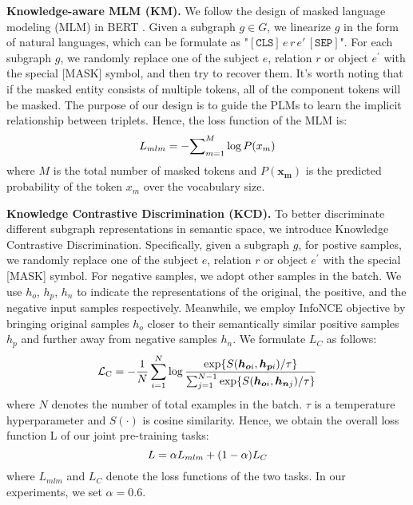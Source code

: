\documentclass[sigconf,natbib=true,anonymous=False]{acmart}
\def\bs{\boldsymbol}
\begin{document}
\textbf{Knowledge-aware MLM (KM).} We follow the design of masked language modeling (MLM) in BERT \cite{devlin2018bert}. Given a subgraph $g \in G$, we linearize $g$ in the form of natural languages, which can be formulate as "$\mathtt{[CLS]} \,  e\, r\, e' \, \mathtt{[SEP]}$".
For each subgraph $g$, we randomly replace one of the subject $e$, relation $r$ or object $e^{'}$ with the special [MASK] symbol, and then try to recover them. It's worth noting that if the masked entity consists of multiple tokens, all of the component tokens will be masked.
The purpose of our design is to guide the PLMs to learn the implicit relationship between triplets. Hence, the loss function of the MLM is:
\begin{equation}
\begin{small}
{L}_{mlm}=-{\sum}_{m=1}^{M}\log P({x_m})
\end{small}
\end{equation}
where $M$ is the total number of masked tokens and $P(\bm{x_m})$ is the predicted probability of the token $x_m$ over the vocabulary size.

\textbf{Knowledge Contrastive Discrimination (KCD).} To better discriminate different subgraph representations in semantic space, we introduce Knowledge Contrastive Discrimination. Specifically, given a subgraph $g$, for postive samples, we randomly replace one of the subject $e$, relation $r$ or object $e^{'}$ with the special [MASK] symbol. For negative samples, we adopt other samples in the batch. We use $h_{o}$, $h_{p}$, $h_{n}$ to indicate the representations of the original, the positive, and the negative input samples respectively. Meanwhile, we employ InfoNCE \cite{aitchison2021infonce} objective by bringing original samples $h_{o}$ closer to their semantically similar positive samples $h_{p}$ and further away from negative samples $h_{n}$. We formulate $L_{C}$ as follows:
\begin{equation}
\small
\mathcal L_{\rm C}=-\frac{1}{N}\sum_{i=1}^{N} \log\frac{\exp\{S(\bs h_{\bs oi}, \bs h_{\bs pi})/\tau\}}{\sum_{j=1}^{N-1}\exp\{S(\bs h_{\bs oi}, \bs h_{\bs nj})/\tau\}} 
\end{equation}
where $N$ denotes the number of total examples in the batch. $\tau$ is a temperature hyperparameter and $S(\cdot)$ is cosine similarity. Hence, we obtain the overall loss function L of our joint pre-training tasks:
\begin{equation}
\begin{small}
L = \alpha L_{mlm}+ (1-\alpha) L_{C}
\end{small}
\end{equation}
where $L_{mlm}$ and $L_C$ denote the loss functions of the two tasks. In our experiments, we set $\alpha = 0.6$.
\end{document}
